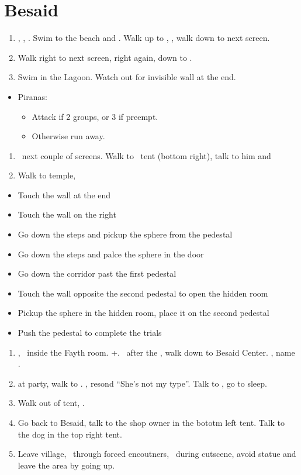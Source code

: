 \chapter{Besaid}

\begin{enumerate}
	\item \cs[0:30], \sd, \fmv. Swim to the beach and \sd. Walk up to \wakka, \sd, walk down to next screen.
	\item Walk right to next screen, right again, down to \wakka.
	\item Swim in the Lagoon. Watch out for invisible wall at the end.
\end{enumerate}
\begin{encounters}
	\begin{itemize}
		\item Piranas:
		\begin{itemize}
			\item Attack if 2 groups, or 3 if preempt.
			\item Otherwise run away.
		\end{itemize}
	\end{itemize}
\end{encounters}
\begin{enumerate}[resume]
	\item \sd\ next couple of screens. Walk to \wakka\ tent (bottom right), talk to him and \sd
	\item Walk to temple, \sd
\end{enumerate}
\begin{trial}
	\begin{itemize}
		\item Touch the wall at the end
		\item Touch the wall on the right
		\item Go down the steps and pickup the sphere from the pedestal
		\item Go down the steps and palce the sphere in the door
		\item Go down the corridor past the first pedestal
		\item Touch the wall opposite the second pedestal to open the hidden room
		\item Pickup the sphere in the hidden room, place it on the second pedestal
		\item Push the pedestal to complete the trials
	\end{itemize}
\end{trial}
\begin{enumerate}[resume]
	\item \cs[1:00], \sd\ inside the Fayth room. \fmv+\cs[1:00]. \sd\ after the \fmv, walk down to Besaid Center. \cs[1:40], name \valefor.
	\item \sd at party, walk to \yuna. \sd, resond ``She's not my type''. Talk to \wakka, go to sleep.
	\item Walk out of tent, \sd.
	\item Go back to Besaid, talk to the shop owner in the bototm left tent. Talk to the dog in the top right tent.
	\item Leave village, \sd\ through forced encoutners, \sd\ during cutscene, avoid statue and leave the area by going up.
\end{enumerate}
